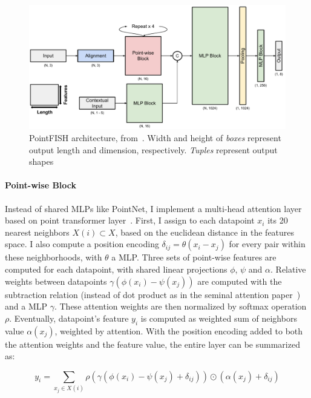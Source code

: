 \begin{figure}[]
    \centering
    \includegraphics[width=1\textwidth]{figures/chapter4/PointFISH_architecture}
    \caption[PointFISH model]{PointFISH architecture, from~\cite{pointfish_2022}.
	Width and height of \textit{boxes} represent output length and dimension, respectively.
	\textit{Tuples} represent output shapes}
    \label{fig:PointFISH_architecture}
\end{figure}

\paragraph{Point-wise Block}

Instead of shared MLPs like PointNet, I implement a multi-head attention layer based on point transformer layer~\cite{Zhao_2021_ICCV}.
First, I assign to each datapoint $x_i$ its 20 nearest neighbors $X(i) \subset X$, based on the euclidean distance in the features space.
I also compute a position encoding $\delta_{ij} = \theta(x_i - x_j)$ for every pair within these neighborhoods, with $\theta$ a MLP.
Three sets of point-wise features are computed for each datapoint, with shared linear projections $\phi$, $\psi$ and $\alpha$.
Relative weights between datapoints $\gamma(\phi(x_i) - \psi(x_j))$ are computed with the subtraction relation (instead of dot product as in the seminal attention paper~\cite{NIPS2017_3f5ee243}) and a MLP $\gamma$.
These attention weights are then normalized by softmax operation $\rho$.
Eventually, datapoint's feature $y_i$ is computed as weighted sum of neighbors value $\alpha(x_j)$, weighted by attention.
With the position encoding added to both the attention weights and the feature value, the entire layer can be summarized as:

\begin{equation}
	{\displaystyle y_i = \sum_{x_j \in X(i)} \rho(\gamma(\phi(x_i) - \psi(x_j) + \delta_{ij})) \odot (\alpha(x_j) + \delta_{ij})}
\end{equation}

